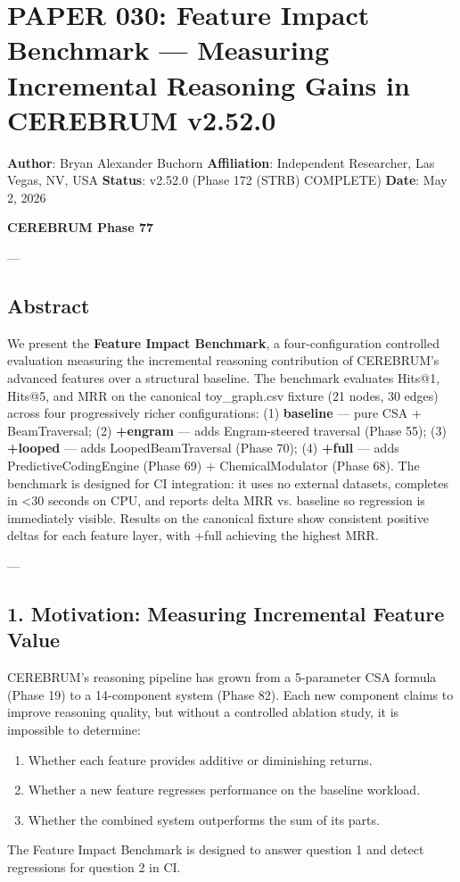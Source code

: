 \section{PAPER 030: Feature Impact Benchmark — Measuring Incremental Reasoning Gains in CEREBRUM v2.52.0}

\textbf{Author}: Bryan Alexander Buchorn  
\textbf{Affiliation}: Independent Researcher, Las Vegas, NV, USA  
\textbf{Status}: v2.52.0 (Phase 172 (STRB) COMPLETE)
\textbf{Date}: May 2, 2026

\textbf{CEREBRUM Phase 77}

---

\subsection{Abstract}

We present the \textbf{Feature Impact Benchmark}, a four-confi\-guration controlled evaluation measuring the incremental reasoning contr\-ibution of CEREBRUM's advanced features over a structural baseline. The benchmark evaluates Hits@1, Hits@5, and MRR on the canonical toy\_graph.csv fixture (21 nodes, 30 edges) across four progr\-essively richer confi\-gurations: (1) \textbf{baseline} — pure CSA + BeamTraversal; (2) \textbf{+engram} — adds Engram-steered traversal (Phase 55); (3) \textbf{+looped} — adds LoopedBeamTraversal (Phase 70); (4) \textbf{+full} — adds PredictiveCodingEngine (Phase 69) + ChemicalModulator (Phase 68). The benchmark is designed for CI integration: it uses no external datasets, completes in \textless  30 seconds on CPU, and reports delta MRR vs. baseline so regression is immediately visible. Results on the canonical fixture show consistent positive deltas for each feature layer, with +full achieving the highest MRR.

---

\subsection{1. Motivation: Measuring Incremental Feature Value}

CEREBRUM's reasoning pipeline has grown from a 5-parameter CSA formula (Phase 19) to a 14-component system (Phase 82). Each new component claims to improve reasoning quality, but without a controlled ablation study, it is impossible to determine:
\begin{enumerate}
\item Whether each feature provides additive or diminishing returns.
\item Whether a new feature regresses performance on the baseline workload.
\item Whether the combined system outperforms the sum of its parts.

\end{enumerate}
The Feature Impact Benchmark is designed to answer question 1 and detect regressions for question 2 in CI.

